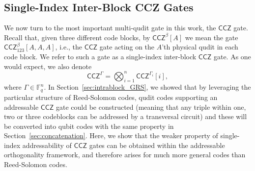 \documentclass[11pt]{article}
\theoremstyle{definition}
\newcommand{\CCZ}{\mathsf{CCZ}}
\begin{document}
\subsection{Single-Index Inter-Block CCZ Gates}\label{sec:address_ortho_single_index_CCZ}

We now turn to the most important multi-qudit gate in this work, the $\CCZ$ gate. Recall that, given three different code blocks, by $\CCZ^\beta[A]$ we mean the gate $\CCZ^\beta_{123}[A,A,A]$, i.e., the $\CCZ$ gate acting on the $A$'th physical qudit in each code block. We refer to such a gate as a single-index inter-block $\CCZ$ gate. As one would expect, we also denote
\begin{equation}
    \CCZ^\Gamma = \bigotimes_{i=1}^n\CCZ^{\Gamma_i}[i],
\end{equation}
where $\Gamma \in \mathbb{F}_q^n$. In Section~\ref{sec:intrablock_GRS}, we showed that by leveraging the particular structure of Reed-Solomon codes, qudit codes supporting an addressable $\CCZ$ gate could be constructed (meaning that any triple within one, two or three codeblocks can be addressed by a transversal circuit) and these will be converted into qubit codes with the same property in Section~\ref{sec:concatenation}. Here, we show that the weaker property of single-index addressability of $\CCZ$ gates can be obtained within the addressable orthogonality framework, and therefore arises for much more general codes than Reed-Solomon codes.
\end{document}
